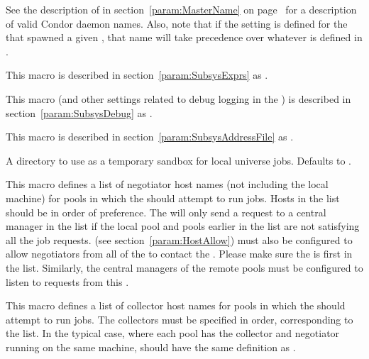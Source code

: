 \begin{description}
  See the description of  in
  section~\ref{param:MasterName} on page~\pageref{param:MasterName}
  for a description of valid Condor daemon names.
  Also, note that if the  setting is defined for
  the  that spawned a given , that name
  will take precedence over whatever is defined in
  . 

\item[\Macro{SCHEDD\_ATTRS}] \label{param:ScheddAttrs} This macro is
  described in section~\ref{param:SubsysExprs} as
  .

\item[\Macro{SCHEDD\_DEBUG}] \label{param:ScheddDebug} This macro
  (and other settings related to debug logging in the ) is
  described in section~\ref{param:SubsysDebug} as
  .

\item[\Macro{SCHEDD\_ADDRESS\_FILE}] \label{param:ScheddAddressFile}
  This macro is described in
  section~\ref{param:SubsysAddressFile} as
  . 

\item[\Macro{SCHEDD\_EXECUTE}] \label{param:ScheddExecute}
  A directory to use as a temporary sandbox for local universe jobs.
  Defaults to .

\item[\Macro{FLOCK\_NEGOTIATOR\_HOSTS}] \label{param:FlockNegotiatorHosts} 
  This macro defines a list of negotiator host names (not including the
  local  machine) for pools in which the
   should attempt to run jobs.  Hosts in the list should be in
  order of preference.  The  will only send a request to a
  central manager in the list if the local pool and pools earlier in
  the list are not satisfying all the job requests.
   (see
  section~\ref{param:HostAllow}) must also be configured to allow
  negotiators from all of the  to
  contact the .  Please make sure the
   is first in the
   list.  Similarly, the
  central managers of the remote pools must be configured to listen to
  requests from this .

\item[\Macro{FLOCK\_COLLECTOR\_HOSTS}] \label{param:FLockCollectorHosts}
  This macro defines a list of collector host names for pools in which
  the  should attempt to run jobs.  The
  collectors must be specified in order, corresponding to the
   list.  In the typical case, where each pool
  has the collector and negotiator running on the same machine,
   should have the same definition as
  .


\end{description}
